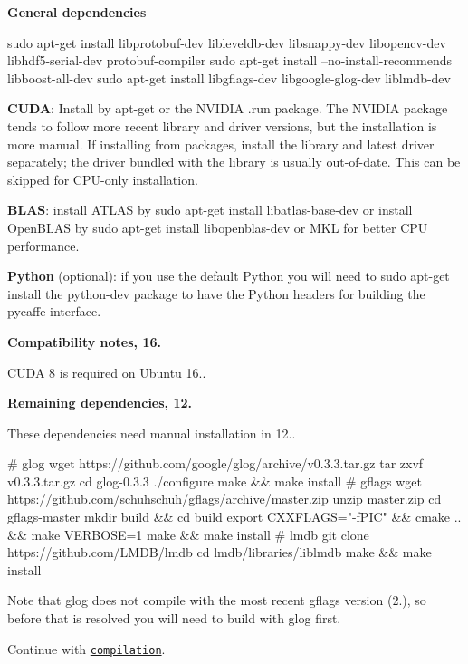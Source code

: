 {\bfseries General dependencies} \begin{DoxyVerb}sudo apt-get install libprotobuf-dev libleveldb-dev libsnappy-dev libopencv-dev libhdf5-serial-dev protobuf-compiler
sudo apt-get install --no-install-recommends libboost-all-dev
sudo apt-get install libgflags-dev libgoogle-glog-dev liblmdb-dev
\end{DoxyVerb}


{\bfseries C\+U\+DA}\+: Install by {\ttfamily apt-\/get} or the N\+V\+I\+D\+IA {\ttfamily .run} package. The N\+V\+I\+D\+IA package tends to follow more recent library and driver versions, but the installation is more manual. If installing from packages, install the library and latest driver separately; the driver bundled with the library is usually out-\/of-\/date. This can be skipped for C\+P\+U-\/only installation.

{\bfseries B\+L\+AS}\+: install A\+T\+L\+AS by {\ttfamily sudo apt-\/get install libatlas-\/base-\/dev} or install Open\+B\+L\+AS by {\ttfamily sudo apt-\/get install libopenblas-\/dev} or M\+KL for better C\+PU performance.

{\bfseries Python} (optional)\+: if you use the default Python you will need to {\ttfamily sudo apt-\/get install} the {\ttfamily python-\/dev} package to have the Python headers for building the pycaffe interface.

{\bfseries Compatibility notes, 16.}

C\+U\+DA 8 is required on Ubuntu 16..

{\bfseries Remaining dependencies, 12.}

These dependencies need manual installation in 12.. \begin{DoxyVerb}# glog
wget https://github.com/google/glog/archive/v0.3.3.tar.gz
tar zxvf v0.3.3.tar.gz
cd glog-0.3.3
./configure
make && make install
# gflags
wget https://github.com/schuhschuh/gflags/archive/master.zip
unzip master.zip
cd gflags-master
mkdir build && cd build
export CXXFLAGS="-fPIC" && cmake .. && make VERBOSE=1
make && make install
# lmdb
git clone https://github.com/LMDB/lmdb
cd lmdb/libraries/liblmdb
make && make install
\end{DoxyVerb}


Note that glog does not compile with the most recent gflags version (2.), so before that is resolved you will need to build with glog first.

Continue with \href{installation.html#compilation}{\tt compilation}. 